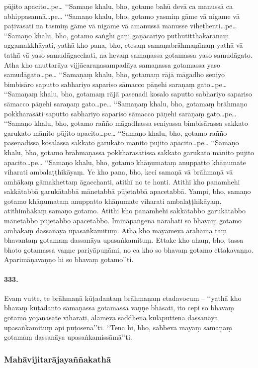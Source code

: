 pūjito apacito…pe… ‘‘Samaṇe khalu, bho, gotame bahū devā ca manussā ca abhippasannā…pe… ‘‘Samaṇo khalu, bho, gotamo yasmiṃ gāme vā nigame vā paṭivasati na tasmiṃ gāme vā nigame vā amanussā manusse viheṭhenti…pe… ‘‘Samaṇo khalu, bho, gotamo saṅghī gaṇī gaṇācariyo puthutitthakarānaṃ aggamakkhāyati, yathā kho pana, bho, etesaṃ samaṇabrāhmaṇānaṃ yathā vā tathā vā yaso samudāgacchati, na hevaṃ samaṇassa gotamassa yaso samudāgato. Atha kho anuttarāya vijjācaraṇasampadāya samaṇassa gotamassa yaso samudāgato…pe… ‘‘Samaṇaṃ khalu, bho, gotamaṃ rājā māgadho seniyo bimbisāro saputto sabhariyo sapariso sāmacco pāṇehi saraṇaṃ gato…pe… ‘‘Samaṇaṃ khalu, bho, gotamaṃ rājā pasenadi kosalo saputto sabhariyo sapariso sāmacco pāṇehi saraṇaṃ gato…pe… ‘‘Samaṇaṃ khalu, bho, gotamaṃ brāhmaṇo pokkharasāti saputto sabhariyo sapariso sāmacco pāṇehi saraṇaṃ gato…pe… ‘‘Samaṇo khalu, bho, gotamo rañño māgadhassa seniyassa bimbisārassa sakkato garukato mānito pūjito apacito…pe… ‘‘Samaṇo khalu, bho, gotamo rañño pasenadissa kosalassa sakkato garukato mānito pūjito apacito…pe… ‘‘Samaṇo khalu, bho, gotamo brāhmaṇassa pokkharasātissa sakkato garukato mānito pūjito apacito…pe… ‘‘Samaṇo khalu, bho, gotamo khāṇumataṃ anuppatto khāṇumate viharati ambalaṭṭhikāyaṃ. Ye kho pana, bho, keci samaṇā vā brāhmaṇā vā amhākaṃ gāmakhettaṃ āgacchanti, atithī no te honti. Atithī kho panamhehi sakkātabbā garukātabbā mānetabbā pūjetabbā apacetabbā. Yampi, bho, samaṇo gotamo khāṇumataṃ anuppatto khāṇumate viharati ambalaṭṭhikāyaṃ, atithimhākaṃ samaṇo gotamo. Atithi kho panamhehi sakkātabbo garukātabbo mānetabbo pūjetabbo apacetabbo. Imināpaṅgena nārahati so bhavaṃ gotamo amhākaṃ dassanāya upasaṅkamituṃ. Atha kho mayameva arahāma taṃ bhavantaṃ gotamaṃ dassanāya upasaṅkamituṃ. Ettake kho ahaṃ, bho, tassa bhoto gotamassa vaṇṇe pariyāpuṇāmi, no ca kho so bhavaṃ gotamo ettakavaṇṇo. Aparimāṇavaṇṇo hi so bhavaṃ gotamo’’ti.

\paragraph{333.} Evaṃ vutte, te brāhmaṇā kūṭadantaṃ brāhmaṇaṃ etadavocuṃ – ‘‘yathā kho bhavaṃ kūṭadanto samaṇassa gotamassa vaṇṇe bhāsati, ito cepi so bhavaṃ gotamo yojanasate viharati, alameva saddhena kulaputtena dassanāya upasaṅkamituṃ api puṭosenā’’ti. ‘‘Tena hi, bho, sabbeva mayaṃ samaṇaṃ gotamaṃ dassanāya upasaṅkamissāmā’’ti.

\subsubsection{Mahāvijitarājayaññakathā}


